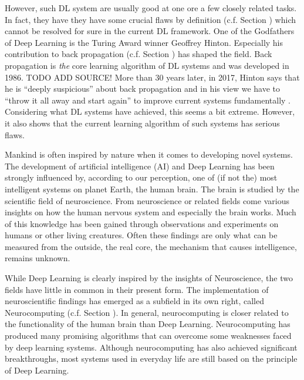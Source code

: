 However, such DL system are usually good at one ore a few closely related tasks.
In fact, they have they have some crucial flaws by definition (c.f. Section ) which cannot be resolved for sure in the current DL framework.
One of the Godfathers of Deep Learning is the Turing Award winner Geoffrey Hinton. 
Especially his contribution to back propagation (c.f. Section ) has shaped the field.
Back propagation is \emph{the} core learning algorithm of DL systems and was developed in 1986. TODO ADD SOURCE!
More than 30 years later, in 2017, Hinton says that he is ``deeply suspicious'' about back propagation and in his view we have to ``throw it all away and start again'' to improve current systems fundamentally .
Considering what DL systems have achieved, this seems a bit extreme.
However, it also shows that the current learning algorithm of such systems has serious flaws.

Mankind is often inspired by nature when it comes to developing novel systems.
The development of artificial intelligence (AI) and Deep Learning has been strongly influenced by, according to our perception, one of (if not the) most intelligent systems on planet Earth, the human brain.
The brain is studied by the scientific field of neuroscience.
From neuroscience or related fields come various insights on how the human nervous system and especially the brain works.
Much of this knowledge has been gained through observations and experiments on humans or other living creatures.
Often these findings are only what can be measured from the outside, the real core, the mechanism that causes intelligence, remains unknown.

While Deep Learning is clearly inspired by the insights of Neuroscience, the two fields have little in common in their present form.
The implementation of neuroscientific findings has emerged as a subfield in its own right, called Neurocomputing (c.f. Section ).
In general, neurocomputing is closer related to the functionality of the human brain than Deep Learning.
Neurocomputing has produced many promising algorithms that can overcome some weaknesses faced by deep learning systems. 
Although neurocomputing has also achieved significant breakthroughs, most systems used in everyday life are still based on the principle of Deep Learning.

